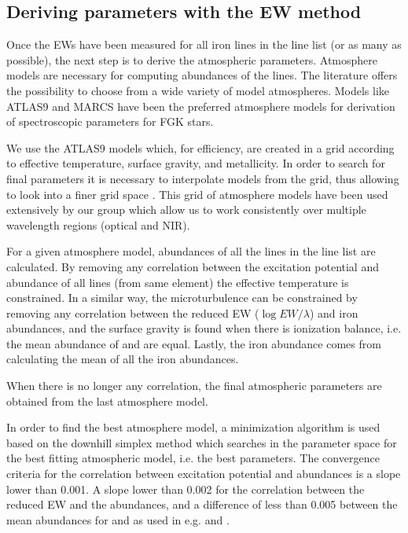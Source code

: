 \documentclass{aa}
\begin{document}
\subsection{Deriving parameters with the EW method}
\label{sec:deriving_parameters_with_the_ew_method}

Once the EWs have been measured for all iron lines in the line list
(or as many as possible), the next step is to derive the atmospheric
parameters. Atmosphere models are necessary for computing abundances of
the lines. The literature offers the possibility to choose from a wide
variety of model atmospheres. Models like ATLAS9 \citep{Kurucz1993} and
MARCS \citep{Gustafson2008} have been the preferred atmosphere models
for derivation of spectroscopic parameters for FGK stars.

We use the ATLAS9 models which, for efficiency, are created in a grid
according to effective temperature, surface gravity, and metallicity.
In order to search for final parameters it is necessary to interpolate
models from the grid, thus allowing to look into a finer grid space
\citep[see e.g.][]{Sousa2014}. This grid of atmosphere models have been
used extensively by our group which allow us to work consistently over
multiple wavelength regions (optical and NIR).

For a given atmosphere model, abundances of all the lines in the line
list are calculated. By removing any correlation between the excitation
potential and abundance of all lines (from same element) the effective
temperature is constrained. In a similar way, the microturbulence
can be constrained by removing any correlation between the reduced EW
($\log EW/\lambda$) and iron abundances, and the surface gravity is
found when there is ionization balance, i.e. the mean abundance of
 and  are equal. Lastly, the iron abundance comes
from calculating the mean of all the iron abundances.

When there is no longer any correlation, the final atmospheric
parameters are obtained from the last atmosphere model.

In order to find the best atmosphere model, a minimization algorithm
is used based on the downhill simplex method \citep{Press1992} which
searches in the parameter space for the best fitting atmospheric model,
i.e. the best parameters. The convergence criteria for the correlation
between excitation potential and abundances is a slope lower than
0.001. A slope lower than 0.002 for the correlation between the reduced
EW and the abundances, and a difference of less than 0.005 between
the mean abundances for  and  as used in e.g.
\cite{Sousa2008a} and \cite{Tsantaki2013}.
\end{document}
